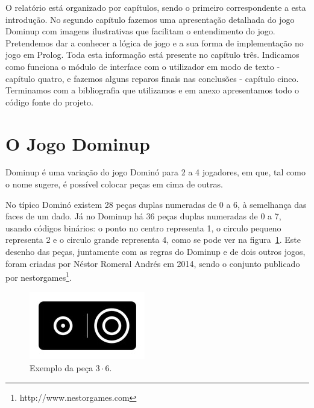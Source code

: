 \documentclass[a4paper]{article}
\begin{document}
O relatório está organizado por capítulos, sendo o primeiro correspondente a esta introdução.
No segundo capítulo fazemos uma apresentação detalhada do jogo Dominup com imagens ilustrativas que facilitam o entendimento do jogo.
Pretendemos dar a conhecer a lógica de jogo e a sua forma de implementação no jogo em Prolog.
Toda esta informação está presente no capítulo três. Indicamos como funciona o módulo de interface com o utilizador em modo de texto - capítulo quatro, e fazemos alguns reparos finais nas conclusões - capítulo cinco. Terminamos com a bibliografia que utilizamos e em anexo apresentamos todo o código fonte do projeto.



\section{O Jogo Dominup}

Dominup é uma variação do jogo Dominó para 2 a 4 jogadores, em que, tal como o nome sugere, é possível colocar peças em cima de outras.

No típico Dominó existem 28 peças duplas numeradas de 0 a 6, à semelhança das faces de um dado. Já no Dominup há 36 peças duplas numeradas de 0 a 7, usando códigos binários: o ponto no centro representa 1, o circulo pequeno representa 2 e o circulo grande representa 4, como se pode ver na figura~\ref{piece}. Este desenho das peças, juntamente com as regras do Dominup e de dois outros jogos, foram criadas por Néstor Romeral Andrés em 2014, sendo o conjunto publicado por nestorgames\footnote[1]{http://www.nestorgames.com}.

\begin{figure}[htbp]
\begin{center}
\includegraphics[scale=0.5]{piece.jpg}
\caption{Exemplo da peça $3 \cdot 6$.}
\label{piece}
\end{center}
\end{figure}
\end{document}
